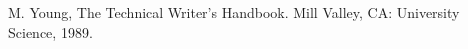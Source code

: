 \begin{thebibliography}{00}
 M. Young, The Technical Writer's Handbook. Mill Valley, CA: University Science, 1989.
\end{thebibliography}

